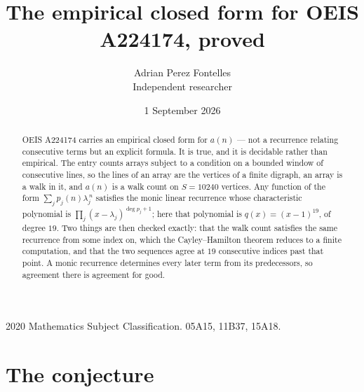 \documentclass[11pt,a4paper]{article}
\title{The empirical closed form for OEIS A224174, proved}
\author{Adrian Perez Fontelles\\ \small Independent researcher}
\date{1 September 2026}
\theoremstyle{plain}
\theoremstyle{definition}
\begin{document}
\maketitle

\begin{abstract}
OEIS A224174 carries an empirical closed form for $a(n)$ --- not a recurrence relating
consecutive terms but an explicit formula. It is true, and it is decidable rather than
empirical. The entry counts arrays subject to a condition on a bounded window of consecutive lines, so the lines of an array are the
vertices of a finite digraph, an array is a walk in it, and $a(n)$ is a walk count on
$S=10240$ vertices. Any function of the form $\sum_j p_j(n)\lambda_j^{\,n}$ satisfies the
monic linear recurrence whose characteristic polynomial is
$\prod_j(x-\lambda_j)^{\deg p_j+1}$; here that polynomial is $q(x)=(x-1)^{19}$, of degree
$19$. Two things are then checked exactly: that the walk count satisfies the same
recurrence from some index on, which the Cayley--Hamilton theorem reduces to a finite
computation, and that the two sequences agree at $19$ consecutive indices past that
point. A monic recurrence determines every later term from its predecessors, so agreement
there is agreement for good.
\end{abstract}

\noindent\small 2020 Mathematics Subject Classification. 05A15, 11B37, 15A18.\normalsize

\section{The conjecture}
\end{document}

